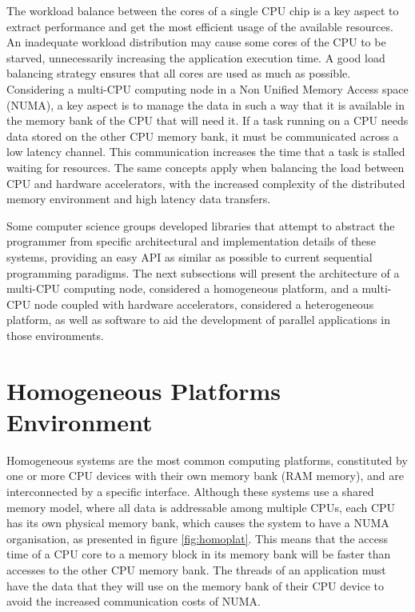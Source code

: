 The workload balance between the cores of a single CPU chip is a key aspect to extract performance and get the most efficient usage of the available resources. An inadequate workload distribution may cause some cores of the CPU to be starved, unnecessarily increasing the application execution time. A good load balancing strategy ensures that all cores are used as much as possible. Considering a multi-CPU computing node in a Non Unified Memory Access space (NUMA), a key aspect is to manage the data in such a way that it is available in the memory bank of the CPU that will need it. If a task running on a CPU needs data stored on the other CPU memory bank, it must be communicated across a low latency channel. This communication increases the time that a task is stalled waiting for resources. The same concepts apply when balancing the load between CPU and hardware accelerators, with the increased complexity of the distributed memory environment and high latency data transfers.

Some computer science groups developed libraries that attempt to abstract the programmer from specific architectural and implementation details of these systems, providing an easy API as similar as possible to current sequential programming paradigms. The next subsections will present the architecture of a multi-CPU computing node, considered a homogeneous platform, and a multi-CPU node coupled with hardware accelerators, considered a heterogeneous platform, as well as software to aid the development of parallel applications in those environments.

\section{Homogeneous Platforms Environment}
\label{homo_systems}

Homogeneous systems are the most common computing platforms, constituted by one or more CPU devices with their own memory bank (RAM memory), and are interconnected by a specific interface. Although these systems use a shared memory model, where all data is addressable among multiple CPUs, each CPU has its own physical memory bank, which causes the system to have a NUMA organisation, as presented in figure \ref{fig:homoplat}. This means that the access time of a CPU core to a memory block in its memory bank will be faster than accesses to the other CPU memory bank. The threads of an application must have the data that they will use on the memory bank of their CPU device to avoid the increased communication costs of NUMA.


